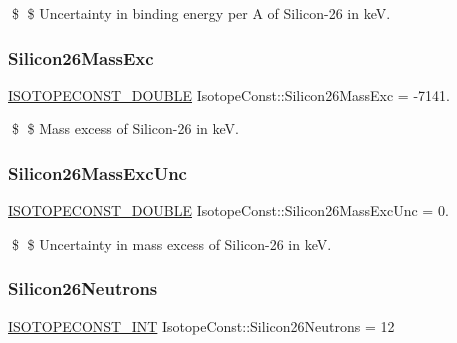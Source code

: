 \$ \$ Uncertainty in binding energy per A of Silicon-\/26 in keV. \mbox{\label{group___isotope_const-_silicon-_si26_gac19519775f032979c674b3c4b06617ff}} 
\subsubsection{\texorpdfstring{Silicon26\+Mass\+Exc}{Silicon26MassExc}}
{\footnotesize\ttfamily \mbox{\hyperlink{group___isotope_const-_macros_ga8f45a7272ce02c0b4c65c44636ed719a}{I\+S\+O\+T\+O\+P\+E\+C\+O\+N\+S\+T\+\_\+\+D\+O\+U\+B\+LE}} Isotope\+Const\+::\+Silicon26\+Mass\+Exc = -\/7141.}

\$ \$ Mass excess of Silicon-\/26 in keV. \mbox{\label{group___isotope_const-_silicon-_si26_ga336b3107286d51287d3fdee7234219a3}} 
\subsubsection{\texorpdfstring{Silicon26\+Mass\+Exc\+Unc}{Silicon26MassExcUnc}}
{\footnotesize\ttfamily \mbox{\hyperlink{group___isotope_const-_macros_ga8f45a7272ce02c0b4c65c44636ed719a}{I\+S\+O\+T\+O\+P\+E\+C\+O\+N\+S\+T\+\_\+\+D\+O\+U\+B\+LE}} Isotope\+Const\+::\+Silicon26\+Mass\+Exc\+Unc = 0.}

\$ \$ Uncertainty in mass excess of Silicon-\/26 in keV. \mbox{\label{group___isotope_const-_silicon-_si26_ga7adfb1676b08516aa954b4d061fdf6f9}} 
\subsubsection{\texorpdfstring{Silicon26\+Neutrons}{Silicon26Neutrons}}
{\footnotesize\ttfamily \mbox{\hyperlink{group___isotope_const-_macros_ga5f18360b3e99483a35c32d789e62621c}{I\+S\+O\+T\+O\+P\+E\+C\+O\+N\+S\+T\+\_\+\+I\+NT}} Isotope\+Const\+::\+Silicon26\+Neutrons = 12}

